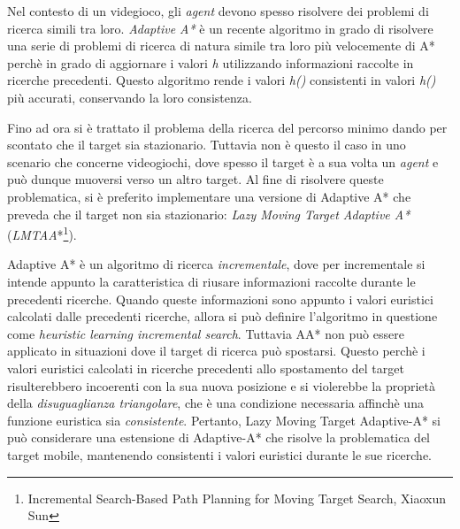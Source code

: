 \documentclass[12pt]{book}
\begin{document}
\par{Nel contesto di un videgioco, gli \emph{agent} devono spesso risolvere dei problemi di ricerca simili tra loro. \emph{Adaptive A*} \`e un recente algoritmo in grado di risolvere una serie di problemi di ricerca di natura simile tra loro pi\`u velocemente di A* perch\`e in grado di aggiornare i valori \emph{h} utilizzando informazioni raccolte in ricerche precedenti. Questo algoritmo rende i valori \emph{h()} consistenti in valori \emph{h()} pi\`u accurati, conservando la loro consistenza.}
\par{Fino ad ora si \`e trattato il problema della ricerca del percorso minimo dando per scontato che il target sia stazionario. Tuttavia non \`e questo il caso in uno scenario che concerne videogiochi, dove spesso il target \`e a sua volta un \emph{agent} e pu\`o dunque muoversi verso un altro target. Al fine di risolvere queste problematica, si \`e preferito implementare una versione di Adaptive A* che preveda che il target non sia stazionario: \emph{Lazy Moving Target Adaptive A*} (\emph{LMTAA}*\footnote{Incremental Search-Based Path Planning for Moving Target Search, Xiaoxun Sun}).}
\par{Adaptive A* \`e un algoritmo  di ricerca \emph{incrementale}, dove per incrementale si intende appunto la caratteristica di riusare informazioni raccolte durante le precedenti ricerche. Quando queste informazioni sono appunto i valori euristici calcolati dalle precedenti ricerche, allora si pu\`o definire l'algoritmo in questione come \emph{heuristic learning incremental search}. Tuttavia AA* non pu\`o essere applicato in situazioni dove il target di ricerca pu\`o spostarsi. Questo perch\`e i valori euristici calcolati in ricerche precedenti allo spostamento del target risulterebbero incoerenti con la sua nuova posizione e si violerebbe la propriet\`a della \emph{disuguaglianza triangolare}, che \`e una condizione necessaria affinch\`e una funzione euristica sia \emph{consistente}. Pertanto, Lazy Moving Target Adaptive-A* si pu\`o considerare una estensione di Adaptive-A* che risolve la problematica del target mobile, mantenendo consistenti i valori euristici durante le sue ricerche.}
\end{document}

